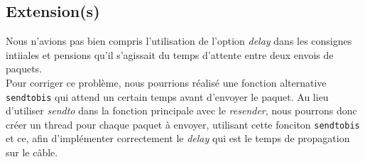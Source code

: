 \documentclass[11pt]{article}
\begin{document}
\subsection{Extension(s)}
Nous n'avions pas bien compris l'utilisation de l'option \textit{delay} dans les consignes intiiales et pensions qu'il s'agissait du temps d'attente entre deux envois de paquets. \\
Pour corriger ce problème, nous pourrions réalisé une fonction alternative \texttt{sendtobis} qui attend un certain temps avant d'envoyer le paquet. Au lieu d'utiliser \textit{sendto} dans la fonction principale avec le \textit{resender}, nous pourrons donc créer un thread pour chaque paquet à envoyer, utilisant cette fonciton \texttt{sendtobis} et ce, afin d'implémenter correctement le \textit{delay} qui est le temps de propagation sur le câble. 
\end{document}
